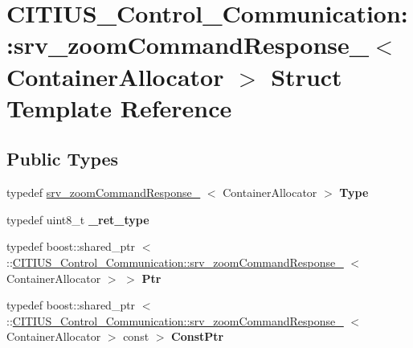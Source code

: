 \hypertarget{struct_c_i_t_i_u_s___control___communication_1_1srv__zoom_command_response__}{\section{\-C\-I\-T\-I\-U\-S\-\_\-\-Control\-\_\-\-Communication\-:\-:srv\-\_\-zoom\-Command\-Response\-\_\-$<$ \-Container\-Allocator $>$ \-Struct \-Template \-Reference}
\label{struct_c_i_t_i_u_s___control___communication_1_1srv__zoom_command_response__}
}
\subsection*{\-Public \-Types}
\begin{DoxyCompactItemize}
\item 
\hypertarget{struct_c_i_t_i_u_s___control___communication_1_1srv__zoom_command_response___ac649949bde4b3f4f0991255ccc8bce21}{typedef \*
\hyperlink{struct_c_i_t_i_u_s___control___communication_1_1srv__zoom_command_response__}{srv\-\_\-zoom\-Command\-Response\-\_\-}\*
$<$ \-Container\-Allocator $>$ {\bfseries \-Type}}\label{struct_c_i_t_i_u_s___control___communication_1_1srv__zoom_command_response___ac649949bde4b3f4f0991255ccc8bce21}

\item 
\hypertarget{struct_c_i_t_i_u_s___control___communication_1_1srv__zoom_command_response___a1011f8306ab1be2c45a6d2c4394c9135}{typedef uint8\-\_\-t {\bfseries \-\_\-ret\-\_\-type}}\label{struct_c_i_t_i_u_s___control___communication_1_1srv__zoom_command_response___a1011f8306ab1be2c45a6d2c4394c9135}

\item 
\hypertarget{struct_c_i_t_i_u_s___control___communication_1_1srv__zoom_command_response___ac124c35b96184dc2334dc544ac7625a1}{typedef boost\-::shared\-\_\-ptr\*
$<$ \-::\hyperlink{struct_c_i_t_i_u_s___control___communication_1_1srv__zoom_command_response__}{\-C\-I\-T\-I\-U\-S\-\_\-\-Control\-\_\-\-Communication\-::srv\-\_\-zoom\-Command\-Response\-\_\-}\*
$<$ \-Container\-Allocator $>$ $>$ {\bfseries \-Ptr}}\label{struct_c_i_t_i_u_s___control___communication_1_1srv__zoom_command_response___ac124c35b96184dc2334dc544ac7625a1}

\item 
\hypertarget{struct_c_i_t_i_u_s___control___communication_1_1srv__zoom_command_response___a51435dcca2cd06f544b7be9f199aa1d5}{typedef boost\-::shared\-\_\-ptr\*
$<$ \-::\hyperlink{struct_c_i_t_i_u_s___control___communication_1_1srv__zoom_command_response__}{\-C\-I\-T\-I\-U\-S\-\_\-\-Control\-\_\-\-Communication\-::srv\-\_\-zoom\-Command\-Response\-\_\-}\*
$<$ \-Container\-Allocator $>$ const  $>$ {\bfseries \-Const\-Ptr}}\label{struct_c_i_t_i_u_s___control___communication_1_1srv__zoom_command_response___a51435dcca2cd06f544b7be9f199aa1d5}

\end{DoxyCompactItemize}
